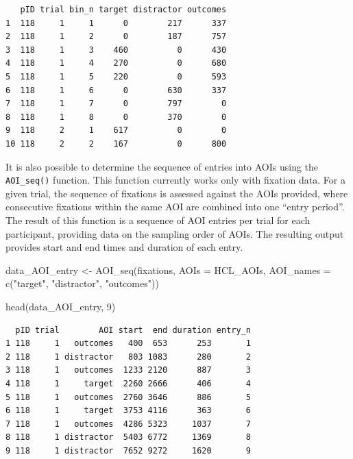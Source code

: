 \documentclass[
  man,
  floatsintext,
  longtable,
  nolmodern,
  notxfonts,
  notimes,
  colorlinks=true,linkcolor=blue,citecolor=blue,urlcolor=blue]{apa7}
\newenvironment{Shaded}{\begin{snugshade}}{\end{snugshade}}
\newcommand{\AttributeTok}[1]{\textcolor[rgb]{0.40,0.45,0.13}{#1}}
\newcommand{\DecValTok}[1]{\textcolor[rgb]{0.68,0.00,0.00}{#1}}
\newcommand{\FunctionTok}[1]{\textcolor[rgb]{0.28,0.35,0.67}{#1}}
\newcommand{\NormalTok}[1]{\textcolor[rgb]{0.00,0.23,0.31}{#1}}
\newcommand{\OtherTok}[1]{\textcolor[rgb]{0.00,0.23,0.31}{#1}}
\newcommand{\StringTok}[1]{\textcolor[rgb]{0.13,0.47,0.30}{#1}}
\begin{document}
\begin{verbatim}
   pID trial bin_n target distractor outcomes
1  118     1     1      0        217      337
2  118     1     2      0        187      757
3  118     1     3    460          0      430
4  118     1     4    270          0      680
5  118     1     5    220          0      593
6  118     1     6      0        630      337
7  118     1     7      0        797        0
8  118     1     8      0        370        0
9  118     2     1    617          0        0
10 118     2     2    167          0      800
\end{verbatim}

It is also possible to determine the sequence of entries into AOIs using
the \texttt{AOI\_seq()} function. This function currently works only
with fixation data. For a given trial, the sequence of fixations is
assessed against the AOIs provided, where consecutive fixations within
the same AOI are combined into one ``entry period''. The result of this
function is a sequence of AOI entries per trial for each participant,
providing data on the sampling order of AOIs. The resulting output
provides start and end times and duration of each entry.

\begin{Shaded}
\begin{Highlighting}[]
\NormalTok{data\_AOI\_entry }\OtherTok{\textless{}{-}} 
  \FunctionTok{AOI\_seq}\NormalTok{(fixations, }
          \AttributeTok{AOIs =}\NormalTok{ HCL\_AOIs,}
          \AttributeTok{AOI\_names =} \FunctionTok{c}\NormalTok{(}\StringTok{"target"}\NormalTok{, }\StringTok{"distractor"}\NormalTok{, }\StringTok{"outcomes"}\NormalTok{))}

\FunctionTok{head}\NormalTok{(data\_AOI\_entry, }\DecValTok{9}\NormalTok{)}
\end{Highlighting}
\end{Shaded}

\begin{verbatim}
  pID trial        AOI start  end duration entry_n
1 118     1   outcomes   400  653      253       1
2 118     1 distractor   803 1083      280       2
3 118     1   outcomes  1233 2120      887       3
4 118     1     target  2260 2666      406       4
5 118     1   outcomes  2760 3646      886       5
6 118     1     target  3753 4116      363       6
7 118     1   outcomes  4286 5323     1037       7
8 118     1 distractor  5403 6772     1369       8
9 118     1 distractor  7652 9272     1620       9
\end{verbatim}
\end{document}
